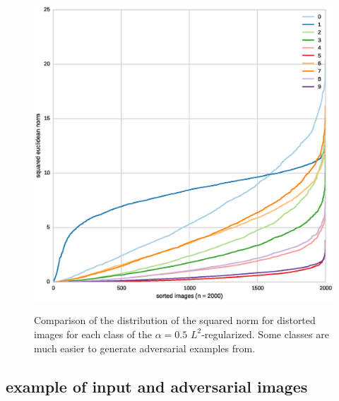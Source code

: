 \documentclass{article} %
\begin{document}
\begin{figure}[h!]
\begin{center}
\includegraphics[scale=0.6]{figs/sup_4}
\label{exp:sup_4}
\caption{\small Comparison of the distribution of the squared norm for distorted images for each class of the
$\alpha=0.5$ $L^2$-regularized. Some classes are much
easier to generate adversarial examples from.}
\end{center}
\end{figure}

\null
\vfill
\raggedbottom
\pagebreak
\newpage


\subsection{example of input and adversarial images}
\end{document}
